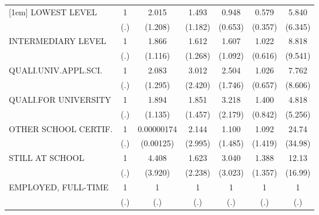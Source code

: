 {\begin{tabular}{l*{6}{c}}
[1em]
LOWEST LEVEL                  &         1         &     2.015         &     1.493         &     0.948         &     0.579         &     5.840         \\
                              &       (.)         &   (1.208)         &   (1.182)         &   (0.653)         &   (0.357)         &   (6.345)         \\
[1em]
INTERMEDIARY LEVEL            &         1         &     1.866         &     1.612         &     1.607         &     1.022         &     8.818\sym{*}  \\
                              &       (.)         &   (1.116)         &   (1.268)         &   (1.092)         &   (0.616)         &   (9.541)         \\
[1em]
QUALI.UNIV.APPL.SCI.          &         1         &     2.083         &     3.012         &     2.504         &     1.026         &     7.762         \\
                              &       (.)         &   (1.295)         &   (2.420)         &   (1.746)         &   (0.657)         &   (8.606)         \\
[1em]
QUALI.FOR UNIVERSITY          &         1         &     1.894         &     1.851         &     3.218         &     1.400         &     4.818         \\
                              &       (.)         &   (1.135)         &   (1.457)         &   (2.179)         &   (0.842)         &   (5.256)         \\
[1em]
OTHER SCHOOL CERTIF.          &         1         &0.00000174         &     2.144         &     1.100         &     1.092         &     24.74\sym{*}  \\
                              &       (.)         & (0.00125)         &   (2.995)         &   (1.485)         &   (1.419)         &   (34.98)         \\
[1em]
STILL AT SCHOOL               &         1         &     4.408         &     1.623         &     3.040         &     1.388         &     12.13         \\
                              &       (.)         &   (3.920)         &   (2.238)         &   (3.023)         &   (1.357)         &   (16.99)         \\
[1em]
EMPLOYED, FULL-TIME           &         1         &         1         &         1         &         1         &         1         &         1         \\
                              &       (.)         &       (.)         &       (.)         &       (.)         &       (.)         &       (.)         \\

\end{tabular}}

